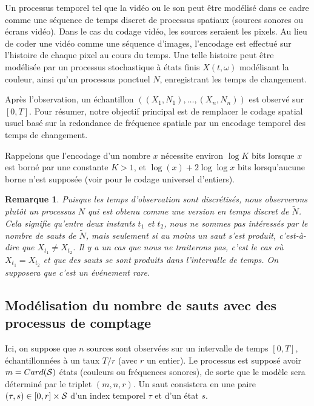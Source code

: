 \documentclass[11pt,a4paper]{article}
\newtheorem{rem}{Remarque}[section]
\def \SR {{\cal S}}
\begin{document}
	Un processus temporel tel que la vidéo ou le son peut être modélisé dans ce cadre comme une séquence de temps discret de processus spatiaux (sources sonores ou écrans vidéo). Dans le cas du codage vidéo, les sources seraient les pixels. Au lieu de coder une vidéo comme une séquence d'images, l'encodage est effectué sur l'histoire de chaque pixel au cours du temps. Une telle histoire peut être modélisée par un processus stochastique à états finis $X(t,\omega)$ modélisant la couleur, ainsi qu'un processus ponctuel $N$, enregistrant les temps de changement.
	
	Après l'observation, un échantillon $((X_1,N_1),\dots,(X_n,N_n))$ est observé sur $[0,T]$. Pour résumer, notre objectif principal est de remplacer le codage spatial usuel basé sur la redondance de fréquence spatiale par un encodage temporel des temps de changement.
	
	Rappelons que l'encodage d'un nombre $x$ nécessite environ $\log K$ bits lorsque $x$ est borné par une constante $K > 1$, et $\log(x) + 2\log\log x$ bits lorsqu'aucune borne n'est supposée (voir \cite{Rissanen83} pour le codage universel d'entiers).
	
	\begin{rem}
		Puisque les temps d'observation sont discrétisés, nous observerons plutôt un processus $N$ qui est obtenu comme une version en temps discret de $\tilde{N}$. Cela signifie qu'entre deux instants $t_1$ et $t_2$, nous ne sommes pas intéressés par le nombre de sauts de $\tilde{N}$, mais seulement si au moins un saut s'est produit, c'est-à-dire que $X_{t_1} \neq X_{t_2}$. Il y a un cas que nous ne traiterons pas, c'est le cas où $X_{t_1} = X_{t_2}$ et que des sauts se sont produits dans l'intervalle de temps. On supposera que c'est un événement rare.
	\end{rem}
	
	\subsection{Modélisation du nombre de sauts avec des processus de comptage}
	\label{subsec:modelisation_sauts}
	
	Ici, on suppose que $n$ sources sont observées sur un intervalle de temps $[0,T]$, échantillonnées à un taux $T/r$ (avec $r$ un entier). Le processus est supposé avoir $m=Card(\SR)$ états (couleurs ou fréquences sonores), de sorte que le modèle sera déterminé par le triplet $(m,n,r)$. Un saut consistera en une paire $(\tau,s) \in [0,r] \times \SR$ d'un index temporel $\tau$ et d'un état $s$.
	
\end{document}
